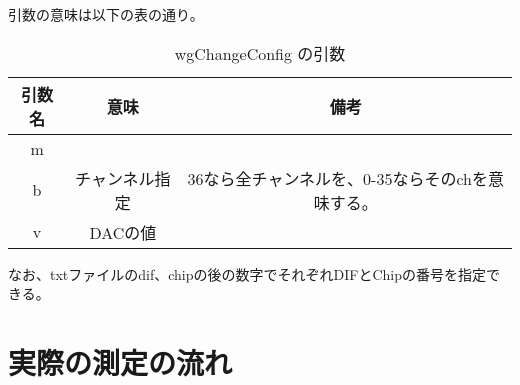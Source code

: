 引数の意味は以下の表の通り。
\begin{table}[H]
\begin{center}
\caption{wgChangeConfig の引数}
\begin{tabular}{ccc} \hline
引数名 & 意味 & 備考 \\ \hline
m &  &  \\
b & チャンネル指定 & 36なら全チャンネルを、0-35ならそのchを意味する。 \\
v & DACの値 &  \\ 
\hline
\end{tabular}
\end{center}
\end{table}
なお、txtファイルのdif、chipの後の数字でそれぞれDIFとChipの番号を指定できる。\\

\newpage
\section{実際の測定の流れ}

